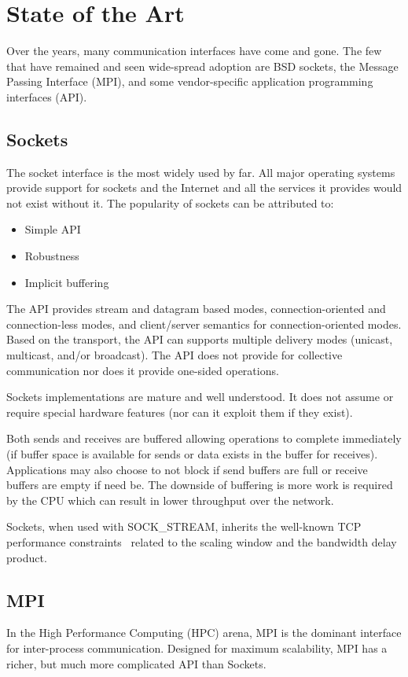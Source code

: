 \section{State of the Art}
\label{sec:state}
Over the years, many communication interfaces have come and gone. The few that have
remained and seen wide-spread adoption are BSD sockets\cite{Sechrest:CSD-84-191}, the Message Passing
Interface (MPI)\cite{mpi_forum93:_mpi}, and some vendor-specific application programming interfaces
(API).

\subsection{Sockets} The socket interface is the most widely used by far. All major
operating systems provide support for sockets and the Internet and all the services it
provides would not exist without it. The popularity of sockets can be attributed to:

\begin{itemize}
\item Simple API
\item Robustness
\item Implicit buffering
\end{itemize}

The API provides stream and datagram based modes, connection-oriented and connection-less
modes, and client/server semantics for connection-oriented modes. Based on the transport,
the API can supports multiple delivery modes (unicast, multicast, and/or broadcast). The
API does not provide for collective communication nor does it provide one-sided
operations.

Sockets implementations are mature and well understood. It does not assume or require
special hardware features (nor can it exploit them if they exist).

Both sends and receives are buffered allowing operations to complete immediately (if buffer
space is available for sends or data exists in the buffer for receives). Applications may
also choose to not block if send buffers are full or receive buffers are empty if need be.
The downside of buffering is more work is required by the CPU which can result in lower
throughput over the network.

Sockets, when used with SOCK\_STREAM, inherits the well-known TCP
performance constraints~\cite{Foong03tcpperformance} related to the
scaling window and the bandwidth delay product. 

\subsection{MPI}\label{sec:mpi} In the High Performance Computing (HPC) arena, MPI is the dominant
interface for inter-process communication. Designed for maximum scalability, MPI has a
richer, but much more complicated API than Sockets.

